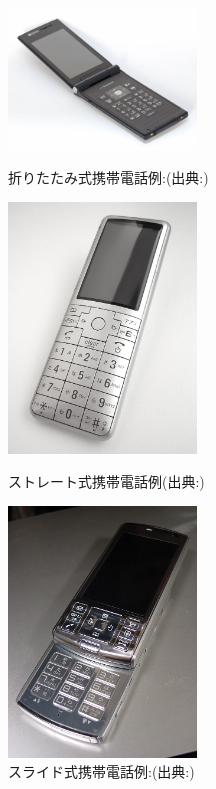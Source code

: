 \begin{figure}[htbp]
  \begin{minipage}{0.3\hsize}
    \begin{center}
      \includegraphics[width=50mm,bb=0 0 1024 768]{images/oritatami.png}
    \end{center}
    \caption{折りたたみ式携帯電話例:(出典:\cite{keitai})}
    \label{fig:oritatami}
  \end{minipage}
  \begin{minipage}{0.3\hsize}
    \begin{center}
      \includegraphics[width=50mm,bb=0 0 147 196]{images/straight.png}
    \end{center}
    \caption{ストレート式携帯電話例(出典:\cite{keitai})}
    \label{fig:straight}
  \end{minipage}
  \begin{minipage}{0.3\hsize}
    \begin{center}
      \includegraphics[width=50mm,bb=0 0 154 205]{images/slide.png}
    \end{center}
    \caption{スライド式携帯電話例:(出典:\cite{keitai})}
    \label{fig:slide}
  \end{minipage}
\end{figure}
